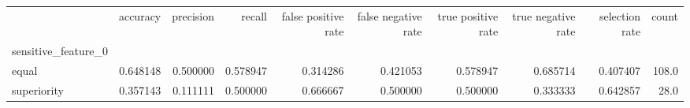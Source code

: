 \begin{tabular}{lrrrrrrrrr}
\toprule
{} &  accuracy &  precision &    recall &  false positive rate &  false negative rate &  true positive rate &  true negative rate &  selection rate &  count \\
sensitive\_feature\_0 &           &            &           &                      &                      &                     &                     &                 &        \\
\midrule
equal               &  0.648148 &   0.500000 &  0.578947 &             0.314286 &             0.421053 &            0.578947 &            0.685714 &        0.407407 &  108.0 \\
superiority         &  0.357143 &   0.111111 &  0.500000 &             0.666667 &             0.500000 &            0.500000 &            0.333333 &        0.642857 &   28.0 \\
\bottomrule
\end{tabular}
